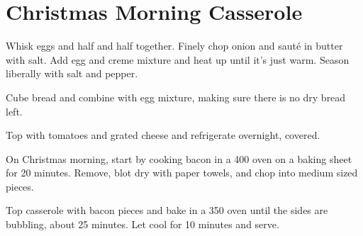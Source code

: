 
\section{Christmas Morning Casserole}
\begin{recipe}



Whisk eggs and half and half together. Finely chop onion and sauté in butter with salt. Add egg and creme mixture and heat up until it's just warm. Season liberally with salt and pepper.

Cube bread and combine with egg mixture, making sure there is no dry bread left.

Top with tomatoes and grated cheese and refrigerate overnight, covered.


On Christmas morning, start by cooking bacon in a 400\degree{} oven on a baking sheet for 20 minutes. Remove, blot dry with paper towels, and chop into medium sized pieces.

Top casserole with bacon pieces and bake in a 350\degree{} oven until the sides are bubbling, about 25 minutes. Let cool for 10 minutes and serve.

\end{recipe}
